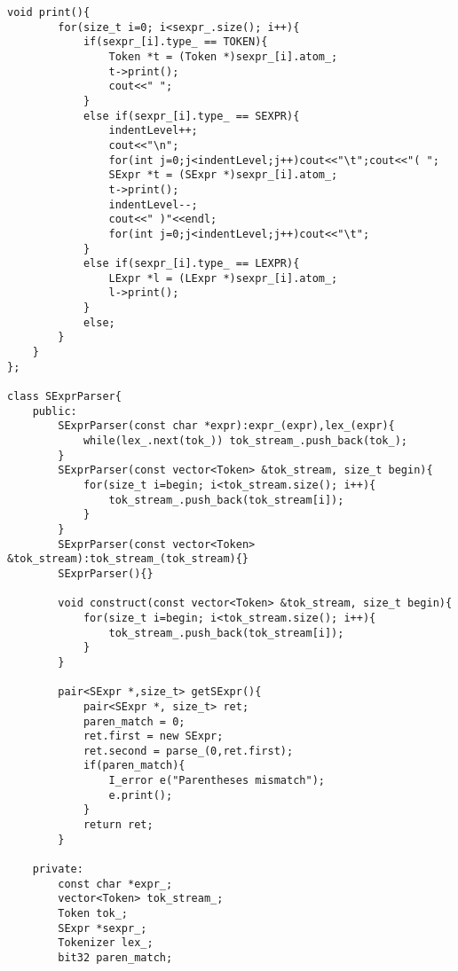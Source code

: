 \documentclass[pdftex,12pt,letterpaper,notitlepage,twoside]{article}
\begin{document}
\begin{lstlisting}[frame=single,caption={C program for testing}]
    void print(){
        for(size_t i=0; i<sexpr_.size(); i++){
            if(sexpr_[i].type_ == TOKEN){
                Token *t = (Token *)sexpr_[i].atom_;
                t->print();
                cout<<" ";
            }
            else if(sexpr_[i].type_ == SEXPR){
                indentLevel++;
                cout<<"\n";
                for(int j=0;j<indentLevel;j++)cout<<"\t";cout<<"( ";
                SExpr *t = (SExpr *)sexpr_[i].atom_;
                t->print();
                indentLevel--;
                cout<<" )"<<endl;
                for(int j=0;j<indentLevel;j++)cout<<"\t";
            }
            else if(sexpr_[i].type_ == LEXPR){
                LExpr *l = (LExpr *)sexpr_[i].atom_;
                l->print();
            }
            else;
        }
    }
};

class SExprParser{
    public:
        SExprParser(const char *expr):expr_(expr),lex_(expr){
            while(lex_.next(tok_)) tok_stream_.push_back(tok_);
        }
        SExprParser(const vector<Token> &tok_stream, size_t begin){
            for(size_t i=begin; i<tok_stream.size(); i++){
                tok_stream_.push_back(tok_stream[i]);
            }
        }
        SExprParser(const vector<Token> &tok_stream):tok_stream_(tok_stream){}
        SExprParser(){}

        void construct(const vector<Token> &tok_stream, size_t begin){
            for(size_t i=begin; i<tok_stream.size(); i++){
                tok_stream_.push_back(tok_stream[i]);
            }
        }
        
        pair<SExpr *,size_t> getSExpr(){
            pair<SExpr *, size_t> ret;
            paren_match = 0;
            ret.first = new SExpr; 
            ret.second = parse_(0,ret.first);
            if(paren_match){
                I_error e("Parentheses mismatch");
                e.print();
            }
            return ret;
        }
    
    private:
        const char *expr_;
        vector<Token> tok_stream_;
        Token tok_;
        SExpr *sexpr_;
        Tokenizer lex_;
        bit32 paren_match;


\end{lstlisting}
\end{document}
